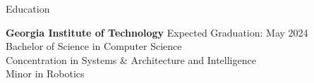 \documentclass{resume} %
\begin{document}

\vspace{-0.5em}
\begin{rSection}{Education}

{\bf Georgia Institute of Technology} \hfill {Expected Graduation: May 2024}\\
Bachelor of Science in Computer Science\\
Concentration in Systems \& Architecture and Intelligence\\
Minor in Robotics

\end{rSection}

\end{document}

